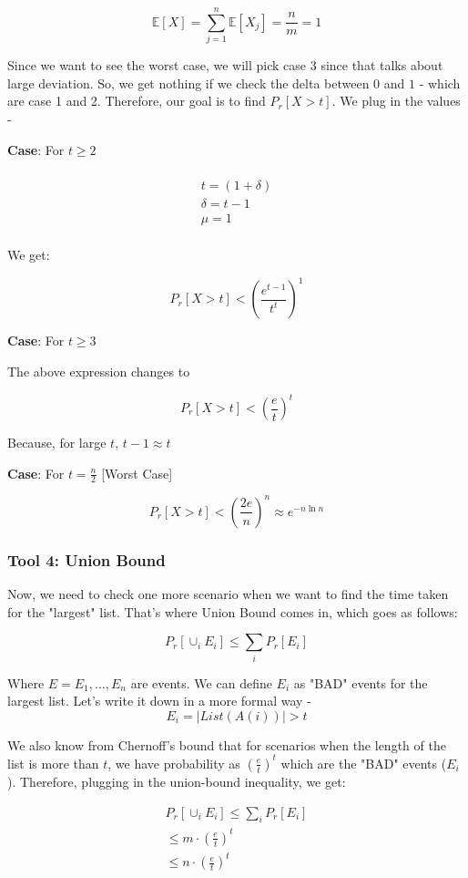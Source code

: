 \documentclass{article}
\begin{document}
$$
\mathbb E[X] = \sum^{n}_{j=1} \mathbb E[X_j] = \frac{n}{m} = 1
$$

Since we want to see the worst case, we will pick case 3 since that talks about large deviation. So, we get nothing if we check the delta between $0$ and $1$ - which are case 1 and 2. Therefore, our goal is to find $P_r[X > t]$. We plug in the values - 

\textbf{Case}: For $t \geq 2$

\begin{align*} \\
t = (1+\delta) \\
\delta = t - 1 \\
\mu = 1 \\
\end{align*}

We get:

$$
P_r[X>t] < \left(\frac{e^{t-1}}{t^t}\right)^1
$$

\textbf{Case}: For $t \geq 3$

The above expression changes to 

$$
P_r[X>t] < \left(\frac{e}{t}\right)^t
$$

Because, for large $t$, $t-1 \approx t$

\textbf{Case}: For $t = \frac{n}{2}$ [Worst Case]

$$
P_r[X>t] < \left(\frac{2e}{n}\right)^n \approx e^{-n \ln n}
$$

\subsubsection{Tool 4: Union Bound}

Now, we need to check one more scenario when we want to find the time taken for the "largest" list. That's where Union Bound comes in, which goes as follows:

$$
P_r[\cup_i E_i] \leq \sum_i P_r[E_i]
$$

Where $E = E_1, \ldots, E_n$ are events. We can define $E_i$ as "BAD" events for the largest list. Let's write it down in a more formal way - 
$$
E_i = {|List(A(i))| > t}
$$

We also know from Chernoff's bound that for scenarios when the length of the list is more than $t$, we have probability as $\left(\frac{e}{t}\right)^t$ which are the "BAD" events ($E_i$). Therefore, plugging in the union-bound inequality, we get:

\begin{align*}
    P_r[\cup_i E_i] \leq \sum_i P_r[E_i] \\
    \leq m \cdot \left(\frac{e}{t}\right)^t \\
    \leq n \cdot \left(\frac{e}{t}\right)^t
\end{align*}
\end{document}
